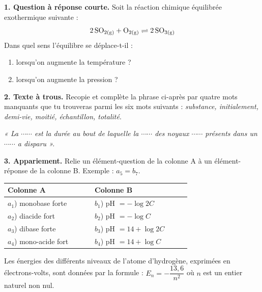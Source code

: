\documentclass[11pt]{article}
\begin{document}



\noindent\textbf{1. Question à réponse courte.} Soit la réaction chimique équilibrée exothermique suivante :
\[ \mathrm{2\,SO_{2(g)} + O_{2(g)}} \rightleftharpoons \mathrm{2\,SO_{3(g)}} \]
Dans quel sens l'équilibre se déplace-t-il :
\begin{enumerate}[label=\alph*.]
  \item lorsqu'on augmente la température ?
  \item lorsqu'on augmente la pression ?
\end{enumerate}

\medskip
\noindent\textbf{2. Texte à trous.} Recopie et complète la phrase ci-après par quatre mots manquants que tu trouveras parmi les six mots suivants : \textit{substance, initialement, demi-vie, moitié, échantillon, totalité}.

\textit{« La $\cdots\cdots$ est la durée au bout de laquelle la $\cdots\cdots$ des noyaux $\cdots\cdots$ présents dans un $\cdots\cdots$ a disparu ».}

\medskip
\noindent\textbf{3. Appariement.} Relie un élément-question de la colonne A à un élément-réponse de la colonne B. Exemple : $a_5 = b_7$.

\begin{center}\renewcommand{\arraystretch}{1.5}
\begin{tabular}{|p{0.38\linewidth}|p{0.42\linewidth}|}
\hline
\textbf{Colonne A} & \textbf{Colonne B} \\
\hline
$a_1$) monobase forte & $b_1$) pH $= -\log 2C$ \\
\hline
$a_2$) diacide fort & $b_2$) pH $= -\log C$ \\
\hline
$a_3$) dibase forte & $b_3$) pH $= 14 + \log 2C$ \\
\hline
$a_4$) mono-acide fort & $b_4$) pH $= 14 + \log C$ \\
\hline
\end{tabular}
\end{center}

Les énergies des différents niveaux de l'atome d'hydrogène, exprimées en électrons-volts, sont données par la formule : $E_n = -\dfrac{13{,}6}{n^2}$ où $n$ est un entier naturel non nul.
\end{document}
